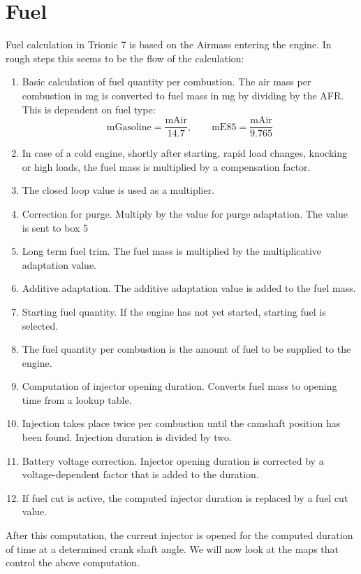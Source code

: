 \documentclass[11pt,a4paper]{book}
\begin{document}
\section{Fuel}
Fuel calculation in Trionic 7 is based on the Airmass entering the engine. In
rough steps this seems to be the flow of the calculation:

\begin{enumerate}
    \item Basic calculation of fuel quantity per combustion. The air mass per
        combustion in \si{\milli\gram} is converted to fuel mass in
        \si{\milli\gram} by dividing by the AFR. This is dependent on fuel type:
        \begin{equation}
            \text{mGasoline}=\frac{\text{mAir}}{14.7}, \qquad
            \text{mE85}=\frac{\text{mAir}}{9.765}
        \end{equation}
    \item In case of a cold engine, shortly after starting, rapid load changes,
        knocking or high loads, the fuel mass is multiplied by a compensation
        factor.
    \item The closed loop value is used as a multiplier.
    \item Correction for purge. Multiply by the value for purge adaptation. The
        value is sent to box 5
    \item Long term fuel trim. The fuel mass is multiplied by the multiplicative
        adaptation value.
    \item Additive adaptation. The additive adaptation value is added to the
        fuel mass.
    \item Starting fuel quantity. If the engine has not yet started, starting fuel is
        selected.
    \item The fuel quantity per combustion is the amount of fuel to be
        supplied to the engine.
    \item Computation of injector opening duration. Converts fuel mass to
        opening time from a lookup table.
    \item Injection takes place twice per combustion until the
        camshaft position has been found. Injection duration
        is divided by two.
    \item Battery voltage correction. Injector opening duration is corrected
        by a voltage-dependent factor that is added to the duration.
    \item If fuel cut is active, the computed injector duration is replaced by a
        fuel cut value.
\end{enumerate}
After this computation, the current injector is opened for the computed duration
of time at a determined crank shaft angle. We will now look at the maps that
control the above computation.
\end{document}
